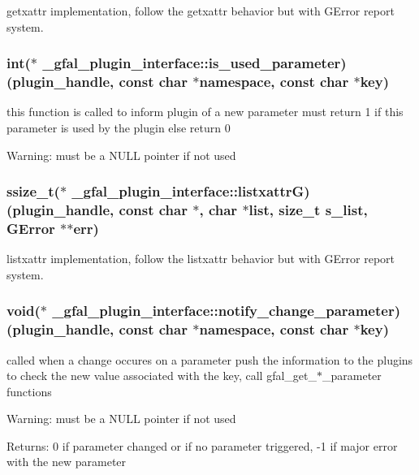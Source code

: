 getxattr implementation, follow the getxattr behavior but with GError report system. 
\subsubsection{\setlength{\rightskip}{0pt plus 5cm}int($\ast$ \bf{\_\-gfal\_\-plugin\_\-interface::is\_\-used\_\-parameter})(plugin\_\-handle, const char $\ast$namespace, const char $\ast$key)}\label{struct__gfal__plugin__interface_ec669e59c0089062136f1c213bf95bd0}


this function is called to inform plugin of a new parameter must return 1 if this parameter is used by the plugin else return 0 \begin{Desc}
\item[Warning:]must be a NULL pointer if not used \end{Desc}
\subsubsection{\setlength{\rightskip}{0pt plus 5cm}ssize\_\-t($\ast$ \bf{\_\-gfal\_\-plugin\_\-interface::listxattr\-G})(plugin\_\-handle, const char $\ast$, char $\ast$list, size\_\-t s\_\-list, GError $\ast$$\ast$err)}\label{struct__gfal__plugin__interface_c3bae2e54ce8998722f03b588d423b18}


listxattr implementation, follow the listxattr behavior but with GError report system. 
\subsubsection{\setlength{\rightskip}{0pt plus 5cm}void($\ast$ \bf{\_\-gfal\_\-plugin\_\-interface::notify\_\-change\_\-parameter})(plugin\_\-handle, const char $\ast$namespace, const char $\ast$key)}\label{struct__gfal__plugin__interface_1de0c0eb24ae2dae8ada69aec8670ddd}


called when a change occures on a parameter push the information to the plugins to check the new value associated with the key, call gfal\_\-get\_\-$\ast$\_\-parameter functions \begin{Desc}
\item[Warning:]must be a NULL pointer if not used \end{Desc}
\begin{Desc}
\item[Returns:]0 if parameter changed or if no parameter triggered, -1 if major error with the new parameter \end{Desc}
